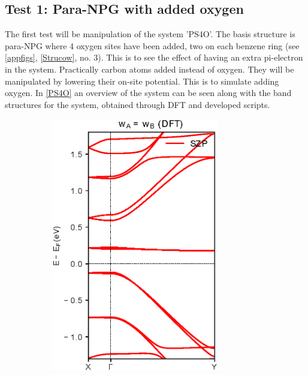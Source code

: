 \subsection{Test 1: Para-NPG with added oxygen}
The first test will be manipulation of the system 'PS4O'. The basis structure is para-NPG where 4 oxygen sites have been added, two on each benzene ring (see \cref{appfigs}, \cref{Strucow}, no. 3). This is to see the effect of having an extra pi-electron in the system. Practically carbon atoms added instead of oxygen. They will be manipulated by lowering their on-site potential. This is to simulate adding oxygen. In \cref{PS4O} an overview of the system can be seen along with the band structures for the system, obtained through DFT and developed scripts.
\begin{figure}[h]
	\centering
	\begin{subfigure}[b]{0.3\textwidth}
		\centering
		\includegraphics[width=0.8\textwidth]{Figures/PS4ODFT.eps}
		\vspace{-1\baselineskip}
		\caption{}
		\label{PS4ODFT}
	\end{subfigure}

\end{figure}
